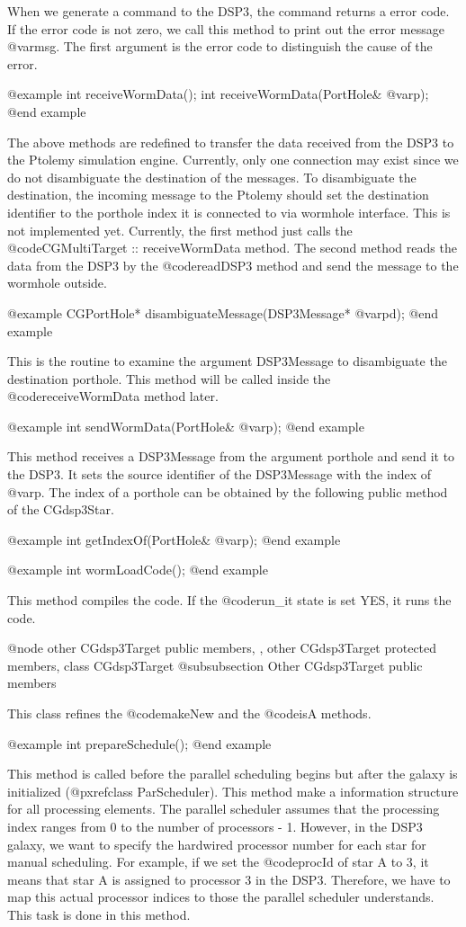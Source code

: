 {When we generate a command to the DSP3, the command returns a error code.
If the error code is not zero, we call this method to print out the
error message @var{msg}. The first argument is the error code to distinguish
the cause of the error.

@example
int receiveWormData();
int receiveWormData(PortHole& @var{p});
@end example

The above methods are redefined to transfer the data received from the
DSP3 to the Ptolemy simulation engine. Currently, only one connection may
exist since we do not disambiguate the destination of the messages.
To disambiguate the destination, the incoming message to the Ptolemy
should set the destination identifier to the porthole index it is connected
to via wormhole interface. This is not implemented yet. Currently, the
first method just calls the @code{CGMultiTarget :: receiveWormData} method.
The second method reads the data from the DSP3 by the @code{readDSP3} method
and send the message to the wormhole outside.

@example
CGPortHole* disambiguateMessage(DSP3Message* @var{pd});
@end example

This is the routine to examine the argument DSP3Message to disambiguate
the destination porthole. This method will be called inside the
@code{receiveWormData} method later. 

@example
int sendWormData(PortHole& @var{p});
@end example

This method receives a DSP3Message from the argument porthole and send it
to the DSP3. It sets the source identifier of the DSP3Message with the
index of @var{p}. The index of a porthole can be obtained
by the following public method of the CGdsp3Star.

@example
int getIndexOf(PortHole& @var{p});
@end example

@example
int wormLoadCode();
@end example

This method compiles the code. If the @code{run_it} state is set YES,
it runs the code.

@node other CGdsp3Target public members, , other CGdsp3Target protected members, class CGdsp3Target
@subsubsection Other CGdsp3Target public members

This class refines the @code{makeNew} and the @code{isA} methods.

@example
int prepareSchedule();
@end example

This method is called before the parallel scheduling begins but after
the galaxy is initialized (@pxref{class ParScheduler}). This method
make a information structure for all processing elements. The parallel
scheduler assumes that the processing index ranges from 0 to the number
of processors - 1. However, in the DSP3 galaxy, we want to specify the
hardwired processor number for each star for manual scheduling. For example,
if we set the @code{procId} of star A to 3, it means that star A is
assigned to processor 3 in the DSP3. Therefore, we have to map this
actual processor indices to those the parallel scheduler understands.
This task is done in this method.

}

